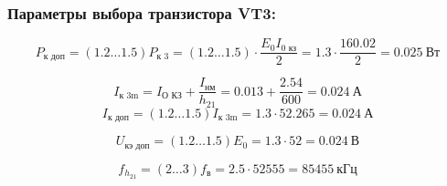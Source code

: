 \subsubsection{Параметры выбора транзистора VT3:}
\begin{equation}
\label{eq:equation3_6}
P_{\text{к доп}} = (1.2 \ldots 1.5) P_{\text{к 3}} = (1.2 \ldots 1.5) \cdot \dfrac{E_0 I_{\text{0 кз}}}{2} = 1.3 \cdot \dfrac{16 0.02}{2} = 0.025~\text{Вт}
\end{equation}

\begin{equation}
\label{eq:equation3_7}
I_{\text{к 3m}} = I_{\text{О КЗ}} + \dfrac{I_{\text{нм}}}{h_21} = 0.013 + \dfrac{2.54}{600} = 0.024~\text{А}
\end{equation}
\begin{equation}
\label{eq:equation3_8}
I_{\text{к доп}} = (1.2 \ldots 1.5) I_{\text{к 3m}} = 1.3 \cdot 52.265 = 0.024~\text{А}
\end{equation}

\begin{equation}
\label{eq:equation3_9}
U_{\text{кэ доп}} = (1.2 \ldots 1.5) E_{\text{0}} = 1.3 \cdot 52 = 0.024~\text{В}
\end{equation}

\begin{equation}
\label{eq:equation3_10}
f_{h_{21}} = (2 \ldots 3) f_{\text{в}} = 2.5 \cdot 52555 = 85455~\text{кГц}
\end{equation}
